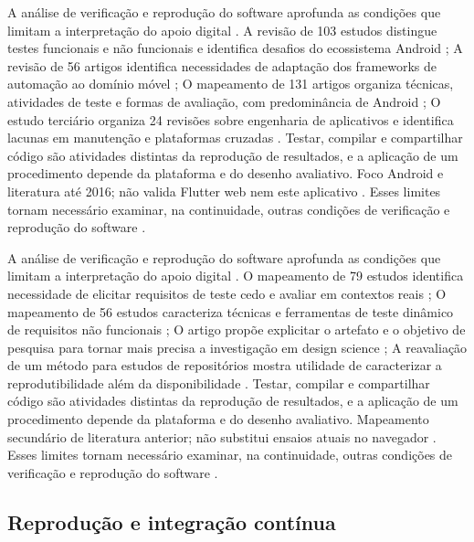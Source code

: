 A análise de verificação e reprodução do software aprofunda as condições que limitam a interpretação do apoio digital \citep{eng01} \citep{eng02} \citep{eng03} \citep{eng04}. A revisão de 103 estudos distingue testes funcionais e não funcionais e identifica desafios do ecossistema Android \citep{eng01}; A revisão de 56 artigos identifica necessidades de adaptação dos frameworks de automação ao domínio móvel \citep{eng02}; O mapeamento de 131 artigos organiza técnicas, atividades de teste e formas de avaliação, com predominância de Android \citep{eng03}; O estudo terciário organiza 24 revisões sobre engenharia de aplicativos e identifica lacunas em manutenção e plataformas cruzadas \citep{eng04}. Testar, compilar e compartilhar código são atividades distintas da reprodução de resultados, e a aplicação de um procedimento depende da plataforma e do desenho avaliativo. Foco Android e literatura até 2016; não valida Flutter web nem este aplicativo \citep{eng01} \citep{eng02} \citep{eng03} \citep{eng04}. Esses limites tornam necessário examinar, na continuidade, outras condições de verificação e reprodução do software \citep{eng01} \citep{eng02} \citep{eng03} \citep{eng04}.

A análise de verificação e reprodução do software aprofunda as condições que limitam a interpretação do apoio digital \citep{eng05} \citep{eng06} \citep{eng07} \citep{eng08}. O mapeamento de 79 estudos identifica necessidade de elicitar requisitos de teste cedo e avaliar em contextos reais \citep{eng05}; O mapeamento de 56 estudos caracteriza técnicas e ferramentas de teste dinâmico de requisitos não funcionais \citep{eng06}; O artigo propõe explicitar o artefato e o objetivo de pesquisa para tornar mais precisa a investigação em design science \citep{eng07}; A reavaliação de um método para estudos de repositórios mostra utilidade de caracterizar a reprodutibilidade além da disponibilidade \citep{eng08}. Testar, compilar e compartilhar código são atividades distintas da reprodução de resultados, e a aplicação de um procedimento depende da plataforma e do desenho avaliativo. Mapeamento secundário de literatura anterior; não substitui ensaios atuais no navegador \citep{eng05} \citep{eng06} \citep{eng07} \citep{eng08}. Esses limites tornam necessário examinar, na continuidade, outras condições de verificação e reprodução do software \citep{eng05} \citep{eng06} \citep{eng07} \citep{eng08}.

\clearpage\subsection*{Reprodução e integração contínua}

